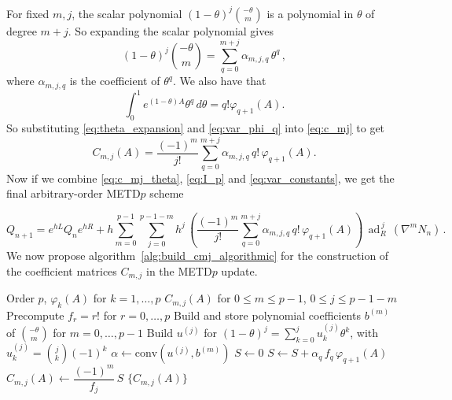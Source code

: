 \documentclass[12pt]{article}
\DeclareMathOperator{\ad}{ad}
\begin{document}
For fixed $m,j$, the scalar polynomial $(1-\theta)^j\binom{-\theta}{m}$ is a polynomial in $\theta$ of degree $m+j$. So expanding the scalar polynomial gives
\begin{equation}
\label{eq:theta_expansion}
    (1-\theta)^j\binom{-\theta}{m} = \sum_{q=0}^{m+j}\alpha_{m,j,q}\, \theta^q \,,
\end{equation}
where $\alpha_{m,j,q}$ is the coefficient of $\theta^q$. We also have that 
\begin{equation}
\label{eq:var_phi_q}
    \int_0^1e^{(1-\theta)A}\theta^q\,d\theta = q!\varphi_{q+1}(A).
\end{equation}
So substituting \eqref{eq:theta_expansion} and \eqref{eq:var_phi_q} into \eqref{eq:c_mj} to get 
\begin{equation}
\label{eq:c_mj_theta}
    C_{m,j}(A) = \frac{(-1)^m}{j!}\sum_{q=0}^{m+j} \alpha_{m,j,q}\,q!\,\varphi_{q+1}(A).
\end{equation}
Now if we combine \eqref{eq:c_mj_theta}, \eqref{eq:I_p} and \eqref{eq:var_constants}, we get the final arbitrary-order METD$p$ scheme

\begin{equation}
    \label{eq:final_schema}
    Q_{n+1} = e^{hL}Q_ne^{hR} +
    h\sum_{m=0}^{p-1}\sum_{j=0}^{p-1-m}h^j\,\left( \frac{(-1)^m}{j!}\sum_{q=0}^{m+j} \alpha_{m,j,q}\,q!\,\varphi_{q+1}(A) \right)\,\ad_R^{\,j}\,\left(\nabla^mN_n \right)\,.
\end{equation}
We now propose algorithm~\ref{alg:build_cmj_algorithmic}  for the construction of the coefficient matrices $C_{m,j}$ in the METD$p$ update.  

\begin{algorithm}[t]
\caption{Build coefficient matrices $C_{m,j}(A)$}
\label{alg:build_cmj_algorithmic}
\begin{algorithmic}[1]
\REQUIRE Order $p$, $\varphi_k(A)$ for $k=1,\ldots,p$
\ENSURE $C_{m,j}(A)$ for $0\le m\le p-1$, $0\le j\le p-1-m$
\STATE Precompute $f_r=r!$ for $r=0,\ldots,p$
\STATE Build and store polynomial coefficients $b^{(m)}$ of $\binom{-\theta}{m}$ for $m=0,\ldots,p-1$
        \STATE Build $u^{(j)}$ for $(1-\theta)^j=\sum_{k=0}^{j}u_k^{(j)}\theta^k$, with $u_k^{(j)}=\binom{j}{k}(-1)^k$
        \STATE $\alpha \leftarrow \mathrm{conv}(u^{(j)},b^{(m)})$
        \STATE $S \leftarrow 0$
            \STATE $S \leftarrow S + \alpha_q\,f_q\,\varphi_{q+1}(A)$
        \ENDFOR
        \STATE $C_{m,j}(A) \leftarrow \dfrac{(-1)^m}{f_j}\,S$
    \ENDFOR
\ENDFOR
\RETURN $\{C_{m,j}(A)\}$
\end{algorithmic}
\end{algorithm}







 

\end{document}
